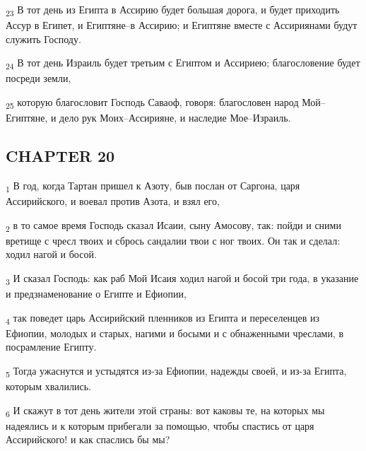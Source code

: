 \begin{tcolorbox}
\textsubscript{23} В тот день из Египта в Ассирию будет большая дорога, и будет приходить Ассур в Египет, и Египтяне--в Ассирию; и Египтяне вместе с Ассириянами будут служить Господу.
\end{tcolorbox}
\begin{tcolorbox}
\textsubscript{24} В тот день Израиль будет третьим с Египтом и Ассириею; благословение будет посреди земли,
\end{tcolorbox}
\begin{tcolorbox}
\textsubscript{25} которую благословит Господь Саваоф, говоря: благословен народ Мой--Египтяне, и дело рук Моих--Ассирияне, и наследие Мое--Израиль.
\end{tcolorbox}
\subsection{CHAPTER 20}
\begin{tcolorbox}
\textsubscript{1} В год, когда Тартан пришел к Азоту, быв послан от Саргона, царя Ассирийского, и воевал против Азота, и взял его,
\end{tcolorbox}
\begin{tcolorbox}
\textsubscript{2} в то самое время Господь сказал Исаии, сыну Амосову, так: пойди и сними вретище с чресл твоих и сбрось сандалии твои с ног твоих. Он так и сделал: ходил нагой и босой.
\end{tcolorbox}
\begin{tcolorbox}
\textsubscript{3} И сказал Господь: как раб Мой Исаия ходил нагой и босой три года, в указание и предзнаменование о Египте и Ефиопии,
\end{tcolorbox}
\begin{tcolorbox}
\textsubscript{4} так поведет царь Ассирийский пленников из Египта и переселенцев из Ефиопии, молодых и старых, нагими и босыми и с обнаженными чреслами, в посрамление Египту.
\end{tcolorbox}
\begin{tcolorbox}
\textsubscript{5} Тогда ужаснутся и устыдятся из-за Ефиопии, надежды своей, и из-за Египта, которым хвалились.
\end{tcolorbox}
\begin{tcolorbox}
\textsubscript{6} И скажут в тот день жители этой страны: вот каковы те, на которых мы надеялись и к которым прибегали за помощью, чтобы спастись от царя Ассирийского! и как спаслись бы мы?
\end{tcolorbox}
